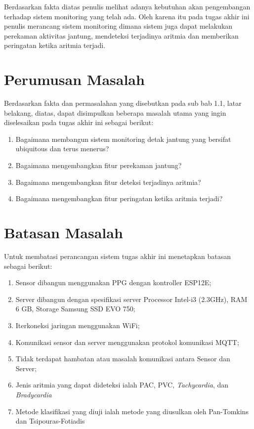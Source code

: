 Berdasarkan fakta diatas penulis melihat adanya kebutuhan akan pengembangan terhadap sistem monitoring yang telah ada. Oleh karena itu pada tugas akhir ini penulis merancang sistem monitoring dimana sistem juga dapat melakukan perekaman aktivitas jantung, mendeteksi terjadinya aritmia dan memberikan peringatan ketika aritmia terjadi.

\section{Perumusan Masalah}
Berdasarkan fakta dan permasalahan yang disebutkan pada sub bab 1.1, latar belakang, diatas, dapat disimpulkan beberapa masalah utama yang ingin diselesaikan pada tugas akhir ini sebagai berikut:
\begin{enumerate}
	\item Bagaimana membangun sistem monitoring detak jantung yang bersifat ubiquitous dan terus menerus?
	\item Bagaimana mengembangkan fitur perekaman jantung?
	\item Bagaimana mengembangkan fitur deteksi terjadinya aritmia?
	\item Bagaimana mengembangkan fitur peringatan ketika aritmia terjadi?
\end{enumerate}
\section{Batasan Masalah}
Untuk membatasi perancangan sistem tugas akhir ini menetapkan batasan sebagai berikut:
\begin{enumerate}
	\item Sensor dibangun menggunakan PPG dengan kontroller ESP12E;
    \item Server dibangun dengan spesifikasi server Processor Intel-i3 (2.3GHz), RAM 6 GB, Storage Samsung SSD EVO 750;
    \item Iterkoneksi jaringan menggunakan WiFi;
    \item Komunikasi sensor dan server menggunakan protokol
     komunikasi MQTT;
    \item Tidak terdapat hambatan atau masalah komunikasi antara Sensor dan Server;
    \item Jenis aritmia yang dapat dideteksi ialah PAC, PVC, \textit{Tachycardia}, dan \textit{Bradycardia}
    \item Metode klasifikasi yang diuji ialah metode yang diusulkan oleh Pan-Tomkins dan Tsipouras-Fotiadis
\end{enumerate}
